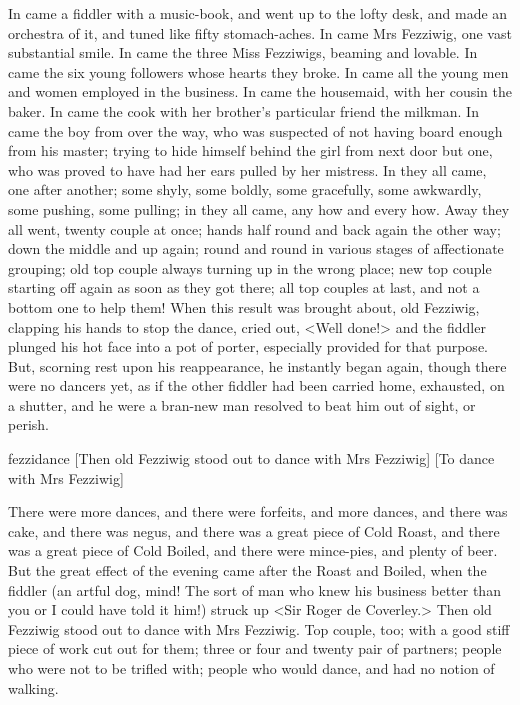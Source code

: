 In came a fiddler with a music-book, and went up to the lofty desk, and made an
orchestra of it, and tuned like fifty stomach-aches. In came Mrs Fezziwig, one
vast substantial smile. In came the three Miss Fezziwigs, beaming and lovable.
In came the six young followers whose hearts they broke. In came all the young
men and women employed in the business. In came the housemaid, with her cousin
the baker. In came the cook with her broth\-er's particular friend the milkman.
In came the boy from over the way, who was suspected of not having board enough
from his master; trying to hide himself behind the girl from next door but one,
who was proved to have had her ears pulled by her mistress. In they all came,
one after another; some shyly, some boldly, some gracefully, some awkwardly,
some pushing, some pulling; in they all came, any how and every how. Away they
all went, twenty couple at once; hands half round and back again the other way;
down the middle and up again; round and round in various stages of affectionate
grouping; old top couple always turning up in the wrong place; new top couple
starting off again as soon as they got there; all top couples at last, and not a
bottom one to help them! When this result was brought about, old Fezziwig,
clapping his hands to stop the dance, cried out, <Well done!> and the fiddler
plunged his hot face into a pot of porter, especially provided for that purpose.
But, scorning rest upon his reappearance, he instantly began again, though there
were no dancers yet, as if the other fiddler had been carried home, exhausted,
on a shutter, and he were a bran-new man resolved to beat him out of sight, or
perish.

  \begin{colorbigpic}
    [\basicscale] 
    {fezzidance}
    [Then old Fezziwig stood out to dance with Mrs Fezziwig]
    [To dance with Mrs Fezziwig]
  \end{colorbigpic}


There were more dances, and there were forfeits, and more dan\-ces, and there
was cake, and there was negus, and there was a great piece of Cold Roast, and
there was a great piece of Cold Boiled, and there were mince-pies, and plenty of
beer. But the great effect of the evening came after the Roast and Boiled, when
the fiddler (an artful dog, mind! The sort of man who knew his business better
than you or I could have told it him!) struck up <Sir Roger de Coverley.> Then
old Fezziwig stood out to dance with Mrs Fezziwig. Top couple, too; with a good
stiff piece of work cut out for them; three or four and twenty pair of partners;
people who were not to be trifled with; people who would dance, and had no
notion of walking.

